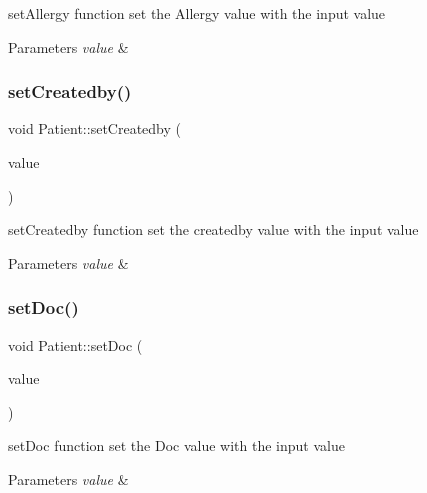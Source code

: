 set\+Allergy function set the Allergy value with the input value 


\begin{DoxyParams}{Parameters}
{\em value} & \\
\hline
\end{DoxyParams}
\mbox{\label{class_patient_ac61823b7a151a384d9b4c06a11013076}} 
\subsubsection{\texorpdfstring{setCreatedby()}{setCreatedby()}}
{\footnotesize\ttfamily void Patient\+::set\+Createdby (\begin{DoxyParamCaption}\item[{const \mbox{\hyperlink{class_utilisateur}{Utilisateur}} \&}]{value }\end{DoxyParamCaption})}



set\+Createdby function set the createdby value with the input value 


\begin{DoxyParams}{Parameters}
{\em value} & \\
\hline
\end{DoxyParams}
\mbox{\label{class_patient_a4682d8a78adadf1edf65dd12b0ca268c}} 
\subsubsection{\texorpdfstring{setDoc()}{setDoc()}}
{\footnotesize\ttfamily void Patient\+::set\+Doc (\begin{DoxyParamCaption}\item[{const Q\+String \&}]{value }\end{DoxyParamCaption})}



set\+Doc function set the Doc value with the input value 


\begin{DoxyParams}{Parameters}
{\em value} & \\
\hline
\end{DoxyParams}
\mbox{\label{class_patient_a0ece648106c80c8df117804f24422676}} 
